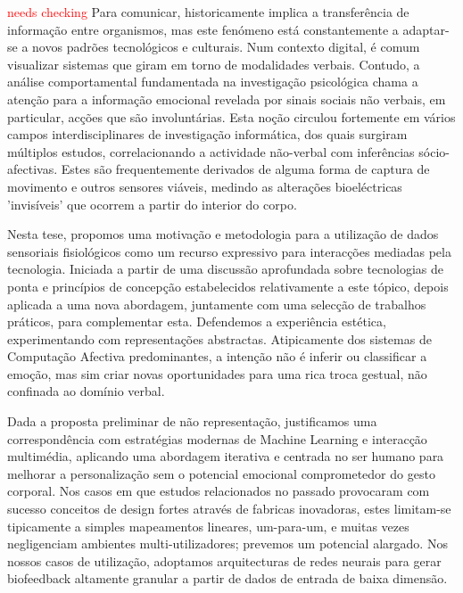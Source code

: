 

\textcolor{red}{needs checking}
Para comunicar, historicamente implica a transferência de informação entre organismos, mas este fenómeno está constantemente a adaptar-se a novos padrões tecnológicos e culturais. Num contexto digital, é comum visualizar sistemas que giram em torno de modalidades verbais. Contudo, a análise comportamental fundamentada na investigação psicológica chama a atenção para a informação emocional revelada por sinais sociais não verbais, em particular, acções que são involuntárias. Esta noção circulou fortemente em vários campos interdisciplinares de investigação informática, dos quais surgiram múltiplos estudos, correlacionando a actividade não-verbal com inferências sócio-afectivas. Estes são frequentemente derivados de alguma forma de captura de movimento e outros sensores viáveis, medindo as alterações bioeléctricas 'invisíveis' que ocorrem a partir do interior do corpo. 

Nesta tese, propomos uma motivação e metodologia para a utilização de dados sensoriais fisiológicos como um recurso expressivo para interacções mediadas pela tecnologia. Iniciada a partir de uma discussão aprofundada sobre tecnologias de ponta e princípios de concepção estabelecidos relativamente a este tópico, depois aplicada a uma nova abordagem, juntamente com uma selecção de trabalhos práticos, para complementar esta. Defendemos a experiência estética, experimentando com representações abstractas. Atipicamente dos sistemas de Computação Afectiva predominantes, a intenção não é inferir ou classificar a emoção, mas sim criar novas oportunidades para uma rica troca gestual, não confinada ao domínio verbal. 

Dada a proposta preliminar de não representação, justificamos uma correspondência com estratégias modernas de Machine Learning e interacção multimédia, aplicando uma abordagem iterativa e centrada no ser humano para melhorar a personalização sem o potencial emocional comprometedor do gesto corporal. Nos casos em que estudos relacionados no passado provocaram com sucesso conceitos de design fortes através de fabricas inovadoras, estes limitam-se tipicamente a simples mapeamentos lineares, um-para-um, e muitas vezes negligenciam ambientes multi-utilizadores; prevemos um potencial alargado. Nos nossos casos de utilização, adoptamos arquitecturas de redes neurais para gerar biofeedback altamente granular a partir de dados de entrada de baixa dimensão.

